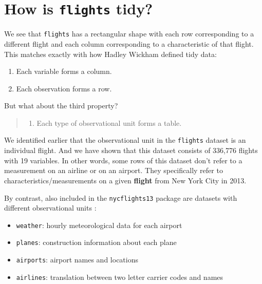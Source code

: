 \documentclass[]{tufte-book}
\providecommand{\tightlist}{%
  \setlength{\itemsep}{0pt}\setlength{\parskip}{0pt}}
\theoremstyle{definition}
\theoremstyle{definition}
\theoremstyle{remark}
\begin{document}
\section{\texorpdfstring{How is \texttt{flights}
tidy?}{How is flights tidy?}}\label{how-is-flights-tidy}

We see that \texttt{flights} has a rectangular shape with each row
corresponding to a different flight and each column corresponding to a
characteristic of that flight. This matches exactly with how Hadley
Wickham defined tidy data:

\begin{enumerate}
\def\labelenumi{\arabic{enumi}.}
\tightlist
\item
  Each variable forms a column.
\item
  Each observation forms a row.
\end{enumerate}

But what about the third property?

\begin{quote}
\begin{enumerate}
\def\labelenumi{\arabic{enumi}.}
\setcounter{enumi}{2}
\tightlist
\item
  Each type of observational unit forms a table.
\end{enumerate}
\end{quote}

We identified earlier that the observational unit in the
\texttt{flights} dataset is an individual flight. And we have shown that
this dataset consists of 336,776 flights with 19 variables. In other
words, some rows of this dataset don't refer to a measurement on an
airline or on an airport. They specifically refer to
characteristics/measurements on a given \textbf{flight} from New York
City in 2013.

By contrast, also included in the \texttt{nycflights13} package are
datasets with different observational units \citep{R-nycflights13}:

\begin{itemize}
\tightlist
\item
  \texttt{weather}: hourly meteorological data for each airport
\item
  \texttt{planes}: construction information about each plane
\item
  \texttt{airports}: airport names and locations
\item
  \texttt{airlines}: translation between two letter carrier codes and
  names
\end{itemize}
\end{document}
